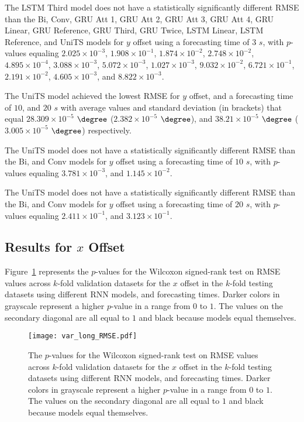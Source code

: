 The LSTM Third model does not have a statistically significantly different RMSE than the Bi, Conv, GRU Att 1, GRU Att 2, GRU Att 3, GRU Att 4, GRU Linear, GRU Reference, GRU Third, GRU Twice, LSTM Linear, LSTM Reference, and UniTS models for $y$ offset using a forecasting time of $3$ $s$, with $p$-values equaling $2.025 \times 10^{-3}$, $1.908 \times 10^{-1}$, $1.874 \times 10^{-2}$, $2.748 \times 10^{-2}$, $4.895 \times 10^{-4}$, $3.088 \times 10^{-3}$, $5.072 \times 10^{-3}$, $1.027 \times 10^{-3}$, $9.032 \times 10^{-2}$, $6.721 \times 10^{-1}$, $2.191 \times 10^{-2}$, $4.605 \times 10^{-3}$, and $8.822 \times 10^{-3}$.

The UniTS model achieved the lowest RMSE for $y$ offset, and a forecasting time of $10$, and $20$ $s$ with average values and standard deviation (in brackets) that equal $28.309 \times 10^{-5}$ $\degree$ ($2.382 \times 10^{-5}$ $\degree$), and $38.21 \times 10^{-5}$ $\degree$ ($3.005 \times 10^{-5}$ $\degree$) respectively.

The UniTS model does not have a statistically significantly different RMSE than the Bi, and Conv models for $y$ offset using a forecasting time of $10$ $s$, with $p$-values equaling $3.781 \times 10^{-3}$, and $1.145 \times 10^{-2}$.

The UniTS model does not have a statistically significantly different RMSE than the Bi, and Conv models for $y$ offset using a forecasting time of $20$ $s$, with $p$-values equaling $2.411 \times 10^{-1}$, and $3.123 \times 10^{-1}$.

\subsection{Results for $x$ Offset}

Figure~\ref{fig:var_long_RMSE} represents the $p$-values for the Wilcoxon signed-rank test on RMSE values across $k$-fold validation datasets for the $x$ offset in the $k$-fold testing datasets using different RNN models, and forecasting times. Darker colors in grayscale represent a higher $p$-value in a range from $0$ to $1$. The values on the secondary diagonal are all equal to $1$ and black because models equal themselves.

\begin{figure}[!ht]
	\centering
	\texttt{[image: var\_long\_RMSE.pdf]}
	\caption{The $p$-values for the Wilcoxon signed-rank test on RMSE values across $k$-fold validation datasets for the $x$ offset in the $k$-fold testing datasets using different RNN models, and forecasting times. Darker colors in grayscale represent a higher $p$-value in a range from $0$ to $1$. The values on the secondary diagonal are all equal to $1$ and black because models equal themselves.}
	\label{fig:var_long_RMSE}
\end{figure}

